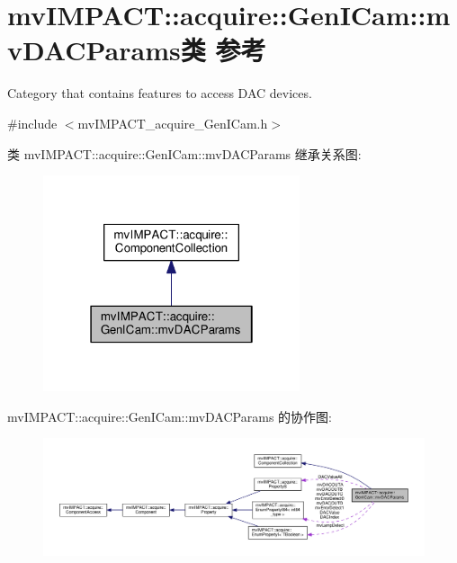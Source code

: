 \hypertarget{classmv_i_m_p_a_c_t_1_1acquire_1_1_gen_i_cam_1_1mv_d_a_c_params}{\section{mv\+I\+M\+P\+A\+C\+T\+:\+:acquire\+:\+:Gen\+I\+Cam\+:\+:mv\+D\+A\+C\+Params类 参考}
\label{classmv_i_m_p_a_c_t_1_1acquire_1_1_gen_i_cam_1_1mv_d_a_c_params}
}


Category that contains features to access D\+A\+C devices.  




{\ttfamily \#include $<$mv\+I\+M\+P\+A\+C\+T\+\_\+acquire\+\_\+\+Gen\+I\+Cam.\+h$>$}



类 mv\+I\+M\+P\+A\+C\+T\+:\+:acquire\+:\+:Gen\+I\+Cam\+:\+:mv\+D\+A\+C\+Params 继承关系图\+:
\nopagebreak
\begin{figure}[H]
\begin{center}
\leavevmode
\includegraphics[width=214pt]{classmv_i_m_p_a_c_t_1_1acquire_1_1_gen_i_cam_1_1mv_d_a_c_params__inherit__graph}
\end{center}
\end{figure}


mv\+I\+M\+P\+A\+C\+T\+:\+:acquire\+:\+:Gen\+I\+Cam\+:\+:mv\+D\+A\+C\+Params 的协作图\+:
\nopagebreak
\begin{figure}[H]
\begin{center}
\leavevmode
\includegraphics[width=350pt]{classmv_i_m_p_a_c_t_1_1acquire_1_1_gen_i_cam_1_1mv_d_a_c_params__coll__graph}
\end{center}
\end{figure}
